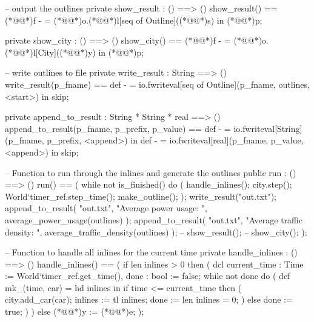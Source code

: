 \documentclass[a4paper]{article}
\begin{document}
\begin{vdm_al}
    -- output the outlines
    private show_result : () ==> ()
    show_result() ==
        (*@@*)f - = (*@@*)o.(*@@*)l[seq of Outline]((*@@*)s) in (*@@*)p;
    
    private show_city : () ==> ()
    show_city() ==
        (*@@*)f - = (*@@*)o.(*@@*)l[City]((*@@*)y) in (*@@*)p;

    -- write outlines to file
    private write_result : String ==> ()
    write_result(p_fname) ==
        def - = io.fwriteval[seq of Outline](p_fname, outlines, <start>) in skip;
    
    private append_to_result : String * String * real ==> ()
    append_to_result(p_fname, p_prefix, p_value) ==
        def - = io.fwriteval[String](p_fname, p_prefix, <append>) in
            def - = io.fwriteval[real](p_fname, p_value, <append>) in skip;

    -- Function to run through the inlines and generate the outlines
    public run : () ==> ()
    run() == (
        while not is_finished() do (
            handle_inlines();
            city.step();
            World`timer_ref.step_time();
            make_outline();
        );
        write_result("out.txt");
        append_to_result(
            "out.txt",
            "Average power usage: ",
            average_power_usage(outlines)
        );
        append_to_result(
            "out.txt",
            "Average traffic density: ",
            average_traffic_density(outlines)
        );
        -- show_result();
        -- show_city();
    );

    -- Function to handle all inlines for the current time
    private handle_inlines : () ==> ()
    handle_inlines() == (
        if len inlines > 0 then (
            dcl current_time : Time := World`timer_ref.get_time(),
                done : bool := false;
            while not done do (
                def mk_(time, car) = hd inlines in
                    if time <= current_time then (
                        city.add_car(car);
                        inlines := tl inlines;
                        done := len inlines = 0;
                    )
                    else done := true;
            )
        )
        else (*@@*)y := (*@@*)e;
    );


\end{vdm_al}
\end{document}
